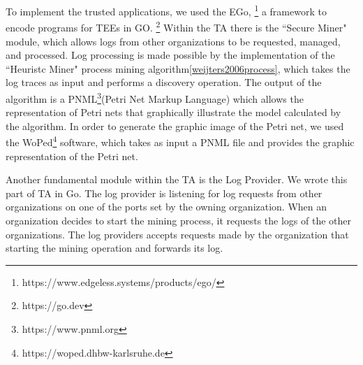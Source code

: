 To implement the trusted applications, we used the EGo,%
\footnote{https://www.edgeless.systems/products/ego/} 
a framework to encode programs for TEEs in %
GO.%
\footnote{https://go.dev}
Within the TA there is the ``Secure Miner" module, which allows logs from other organizations to be requested, managed, and processed. Log processing is made possible by the implementation of the ``Heuristc Miner" process mining algorithm\ref{weijters2006process}, which takes the log traces as input and performs a discovery operation.
The output of the algorithm is a PNML\footnote{https://www.pnml.org}(Petri Net Markup Language) which allows the representation of Petri nets that graphically illustrate the model calculated by the algorithm. 
In order to generate the graphic image of the Petri net, we used the WoPed\footnote{https://woped.dhbw-karlsruhe.de} software, which takes as input a PNML file and provides the graphic representation of the Petri net. 

Another fundamental module within the TA is the Log Provider. We wrote this part of TA in Go. The log provider is listening for log requests from other organizations on one of the ports set by the owning organization. When an organization decides to start the mining process, it requests the logs of the other organizations. The log providers accepts requests made by the organization that starting the mining operation and forwards its log.